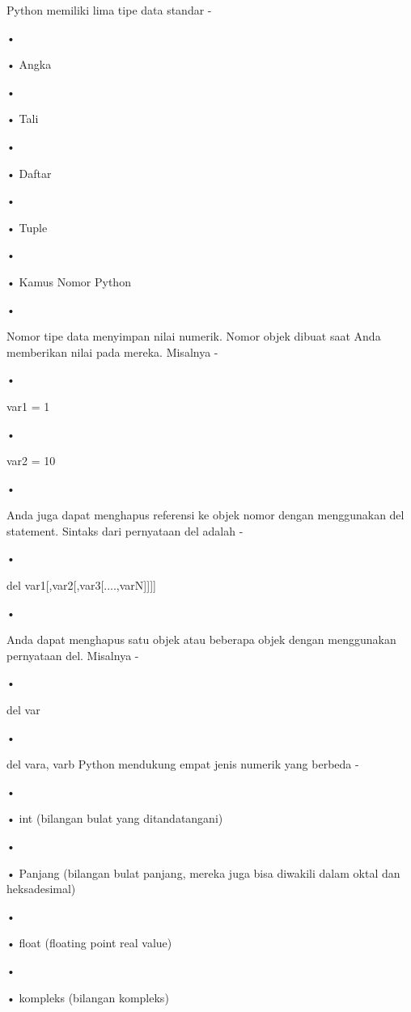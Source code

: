 Python memiliki lima tipe data standar -
\begin{flushleft}
•
\end{flushleft}•	Angka
\begin{flushleft}
•
\end{flushleft}•	Tali
\begin{flushleft}
•
\end{flushleft}•	Daftar
\begin{flushleft}
•
\end{flushleft}•	Tuple
\begin{flushleft}
•
\end{flushleft}•	Kamus
Nomor Python
\begin{flushleft}
•
\end{flushleft}Nomor tipe data menyimpan nilai numerik. Nomor objek dibuat saat Anda memberikan nilai pada mereka. Misalnya -
\begin{flushleft}
•
\end{flushleft}var1 = 1
\begin{flushleft}
•
\end{flushleft}var2 = 10
\begin{flushleft}
•
\end{flushleft}Anda juga dapat menghapus referensi ke objek nomor dengan menggunakan del statement. Sintaks dari pernyataan del adalah -
\begin{flushleft}
•
\end{flushleft}del var1[,var2[,var3[....,varN]]]]
\begin{flushleft}
•
\end{flushleft}Anda dapat menghapus satu objek atau beberapa objek dengan menggunakan pernyataan del. Misalnya -
\begin{flushleft}
•
\end{flushleft}del var
\begin{flushleft}
•
\end{flushleft}del vara, varb
Python mendukung empat jenis numerik yang berbeda -
\begin{flushleft}
•
\end{flushleft}•	int (bilangan bulat yang ditandatangani)
\begin{flushleft}
•
\end{flushleft}•	Panjang (bilangan bulat panjang, mereka juga bisa diwakili dalam oktal dan heksadesimal)
\begin{flushleft}
•
\end{flushleft}•	float (floating point real value)
\begin{flushleft}
•
\end{flushleft}•	kompleks (bilangan kompleks)



